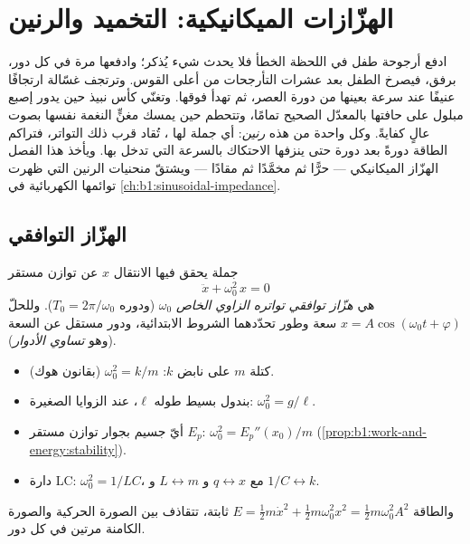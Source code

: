 \chapter{الهزّازات الميكانيكية: التخميد والرنين}\label{ch:b1:oscillators-resonance}

ادفع أرجوحة طفل في اللحظة الخطأ فلا يحدث شيء يُذكر؛ وادفعها
مرة في كل دور، برفق، فيصرخ الطفل بعد عشرات
التأرجحات من أعلى القوس. وترتجف غسّالة ارتجافًا عنيفًا
عند سرعة بعينها من دورة العصر، ثم تهدأ فوقها. وتغنّي
كأس نبيذ حين يدور إصبع مبلول على حافتها بالمعدّل
الصحيح تمامًا، وتتحطم حين يمسك مغنٍّ النغمة نفسها بصوت عالٍ كفايةً.
وكل واحدة من هذه \emph{رنين}: أي جملة لها ، تُقاد قرب ذلك التواتر، فتراكم الطاقة دورةً بعد
دورة حتى ينزفها الاحتكاك بالسرعة التي تدخل بها. ويأخذ هذا
الفصل الهزّاز الميكانيكي --- حرًّا ثم مخمَّدًا ثم مقادًا ---
ويشتقّ منحنيات الرنين التي ظهرت توائمها الكهربائية
في \cref{ch:b1:sinusoidal-impedance}.

\section{الهزّاز التوافقي}

\begin{definition}\label{def:b1:oscillators-resonance:harmonic}
جملة يحقق فيها الانتقال $x$ عن توازن مستقر
\[
\ddot x + \omega_0^2\,x = 0
\]
هي \emph{هزّاز توافقي} \emph{تواتره الزاوي الخاص}
$\omega_0$ (ودوره $T_0 = 2\pi/\omega_0$). وللحلّ $x = A\cos(\omega_0t
+ \varphi)$ سعة وطور تحدّدهما الشروط الابتدائية،
ودور مستقل عن السعة (وهو \emph{تساوي الأدوار}).
\end{definition}

\begin{proposition}\label{prop:b1:oscillators-resonance:sources}
\begin{itemize}
  \item كتلة $m$ على نابض $k$: $\omega_0^2 = k/m$ (بقانون هوك).
  \item بندول بسيط طوله $\ell$، عند الزوايا الصغيرة: $\omega_0^2 = g/\ell$.
  \item أيّ جسيم بجوار توازن مستقر  $E_p$:
        $\omega_0^2 = E_p''(x_0)/m$ (\cref{prop:b1:work-and-energy:stability}).
  \item دارة LC: $\omega_0^2 = 1/LC$، مع $q \leftrightarrow x$
        و $L \leftrightarrow m$ و $1/C \leftrightarrow k$.
\end{itemize}
والطاقة $E = \tfrac12 m\dot x^2 + \tfrac12 m\omega_0^2x^2 = \tfrac12
m\omega_0^2A^2$ ثابتة، تتقاذف بين الصورة الحركية والصورة الكامنة
مرتين في كل دور.
\end{proposition}

